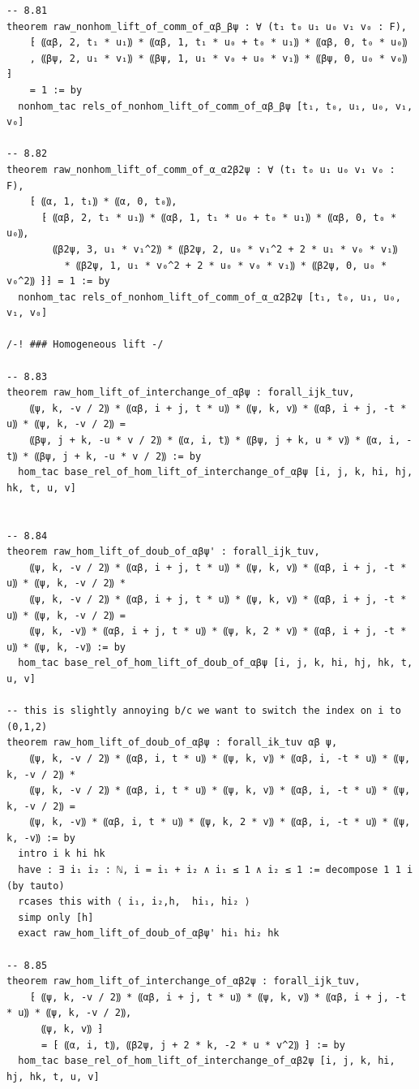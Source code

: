 \begin{Verbatim}
-- 8.81
theorem raw_nonhom_lift_of_comm_of_αβ_βψ : ∀ (t₁ t₀ u₁ u₀ v₁ v₀ : F),
    ⁅ ⸨αβ, 2, t₁ * u₁⸩ * ⸨αβ, 1, t₁ * u₀ + t₀ * u₁⸩ * ⸨αβ, 0, t₀ * u₀⸩
    , ⸨βψ, 2, u₁ * v₁⸩ * ⸨βψ, 1, u₁ * v₀ + u₀ * v₁⸩ * ⸨βψ, 0, u₀ * v₀⸩ ⁆
    = 1 := by
  nonhom_tac rels_of_nonhom_lift_of_comm_of_αβ_βψ [t₁, t₀, u₁, u₀, v₁, v₀]

-- 8.82
theorem raw_nonhom_lift_of_comm_of_α_α2β2ψ : ∀ (t₁ t₀ u₁ u₀ v₁ v₀ : F),
    ⁅ ⸨α, 1, t₁⸩ * ⸨α, 0, t₀⸩,
      ⁅ ⸨αβ, 2, t₁ * u₁⸩ * ⸨αβ, 1, t₁ * u₀ + t₀ * u₁⸩ * ⸨αβ, 0, t₀ * u₀⸩,
        ⸨β2ψ, 3, u₁ * v₁^2⸩ * ⸨β2ψ, 2, u₀ * v₁^2 + 2 * u₁ * v₀ * v₁⸩
          * ⸨β2ψ, 1, u₁ * v₀^2 + 2 * u₀ * v₀ * v₁⸩ * ⸨β2ψ, 0, u₀ * v₀^2⸩ ⁆⁆ = 1 := by
  nonhom_tac rels_of_nonhom_lift_of_comm_of_α_α2β2ψ [t₁, t₀, u₁, u₀, v₁, v₀]

/-! ### Homogeneous lift -/

-- 8.83
theorem raw_hom_lift_of_interchange_of_αβψ : forall_ijk_tuv,
    ⸨ψ, k, -v / 2⸩ * ⸨αβ, i + j, t * u⸩ * ⸨ψ, k, v⸩ * ⸨αβ, i + j, -t * u⸩ * ⸨ψ, k, -v / 2⸩ =
    ⸨βψ, j + k, -u * v / 2⸩ * ⸨α, i, t⸩ * ⸨βψ, j + k, u * v⸩ * ⸨α, i, -t⸩ * ⸨βψ, j + k, -u * v / 2⸩ := by
  hom_tac base_rel_of_hom_lift_of_interchange_of_αβψ [i, j, k, hi, hj, hk, t, u, v]


-- 8.84
theorem raw_hom_lift_of_doub_of_αβψ' : forall_ijk_tuv,
    ⸨ψ, k, -v / 2⸩ * ⸨αβ, i + j, t * u⸩ * ⸨ψ, k, v⸩ * ⸨αβ, i + j, -t * u⸩ * ⸨ψ, k, -v / 2⸩ *
    ⸨ψ, k, -v / 2⸩ * ⸨αβ, i + j, t * u⸩ * ⸨ψ, k, v⸩ * ⸨αβ, i + j, -t * u⸩ * ⸨ψ, k, -v / 2⸩ =
    ⸨ψ, k, -v⸩ * ⸨αβ, i + j, t * u⸩ * ⸨ψ, k, 2 * v⸩ * ⸨αβ, i + j, -t * u⸩ * ⸨ψ, k, -v⸩ := by
  hom_tac base_rel_of_hom_lift_of_doub_of_αβψ [i, j, k, hi, hj, hk, t, u, v]

-- this is slightly annoying b/c we want to switch the index on i to (0,1,2)
theorem raw_hom_lift_of_doub_of_αβψ : forall_ik_tuv αβ ψ,
    ⸨ψ, k, -v / 2⸩ * ⸨αβ, i, t * u⸩ * ⸨ψ, k, v⸩ * ⸨αβ, i, -t * u⸩ * ⸨ψ, k, -v / 2⸩ *
    ⸨ψ, k, -v / 2⸩ * ⸨αβ, i, t * u⸩ * ⸨ψ, k, v⸩ * ⸨αβ, i, -t * u⸩ * ⸨ψ, k, -v / 2⸩ =
    ⸨ψ, k, -v⸩ * ⸨αβ, i, t * u⸩ * ⸨ψ, k, 2 * v⸩ * ⸨αβ, i, -t * u⸩ * ⸨ψ, k, -v⸩ := by
  intro i k hi hk
  have : ∃ i₁ i₂ : ℕ, i = i₁ + i₂ ∧ i₁ ≤ 1 ∧ i₂ ≤ 1 := decompose 1 1 i (by tauto)
  rcases this with ⟨ i₁, i₂,h,  hi₁, hi₂ ⟩
  simp only [h]
  exact raw_hom_lift_of_doub_of_αβψ' hi₁ hi₂ hk

-- 8.85
theorem raw_hom_lift_of_interchange_of_αβ2ψ : forall_ijk_tuv,
    ⁅ ⸨ψ, k, -v / 2⸩ * ⸨αβ, i + j, t * u⸩ * ⸨ψ, k, v⸩ * ⸨αβ, i + j, -t * u⸩ * ⸨ψ, k, -v / 2⸩,
      ⸨ψ, k, v⸩ ⁆
      = ⁅ ⸨α, i, t⸩, ⸨β2ψ, j + 2 * k, -2 * u * v^2⸩ ⁆ := by
  hom_tac base_rel_of_hom_lift_of_interchange_of_αβ2ψ [i, j, k, hi, hj, hk, t, u, v]


\end{Verbatim}
